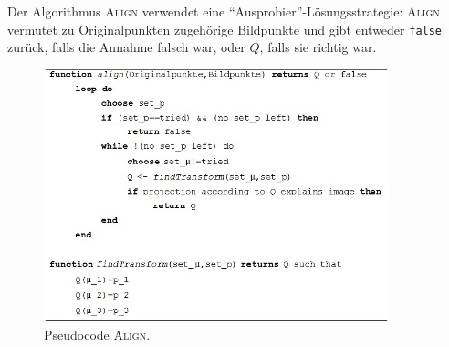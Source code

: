 Der Algorithmus \textsc{Align} verwendet eine "`Ausprobier"'-Lösungsstrategie: \textsc{Align} vermutet zu Originalpunkten zugehörige Bildpunkte und gibt entweder \verb+false+ zurück, falls die Annahme falsch war, oder $Q$, falls sie richtig war.
\begin{figure}[h]
\centering
\includegraphics[width=10cm]{chapters/computervision/grafik_15_align.jpg}
\caption{Pseudocode \textsc{Align}.}
\label{fig:15}
\end{figure}

